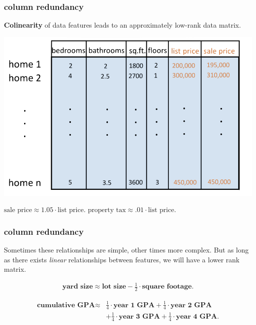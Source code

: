 \documentclass[handout,compress]{beamer}
\begin{document}
\begin{frame}
	\frametitle{column redundancy}
	\textbf{Colinearity} of data features leads to an approximately low-rank data matrix. 
	\begin{center}
		\includegraphics[width=.7\textwidth]{columnview.png}
	\end{center}
$\text{sale price} \approx 1.05 \cdot \text{list price}$. \hspace{5em} $\text{property tax} \approx .01 \cdot \text{list price}$.
\end{frame}


\begin{frame}
	\frametitle{column redundancy}
	Sometimes these relationships are simple, other times more complex. 
	But as long as there exists \emph{linear} relationships between features, we will have a lower rank matrix. 
	
	\begin{align*}
	\textbf{yard size} \approx \textbf{lot size} - \frac{1}{2}\cdot\textbf{square footage}. 
	\end{align*}
	
	\begin{align*}
	\textbf{cumulative GPA} \approx &\frac{1}{4}\cdot\textbf{year 1 GPA} + \frac{1}{4}\cdot\textbf{year 2 GPA} \\ &+ \frac{1}{4}\cdot\textbf{year 3 GPA} + \frac{1}{4}\cdot\textbf{year 4 GPA}.
	\end{align*}
\end{frame}
\end{document}
